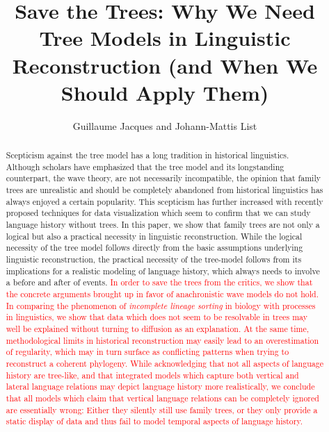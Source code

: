 \documentclass[svgnames,12pt]{scrartcl}
\title{Save the Trees: Why We Need Tree Models in Linguistic Reconstruction (and When We Should
Apply Them)}
\author{Guillaume Jacques and Johann-Mattis List}
\begin{document}
\maketitle

\begin{abstract}
  \small
Scepticism against the tree model has a long tradition in historical linguistics.  Although scholars
have emphasized that the tree model and its longstanding counterpart, the wave theory, are not
necessarily incompatible, the opinion that family trees are unrealistic and should be completely
abandoned from historical linguistics has always enjoyed a certain popularity. This scepticism has
further increased with recently proposed techniques for data visualization which seem to confirm
that we can study language history without trees.  In this paper, we show that family trees are not
only a logical but also a practical necessity in linguistic reconstruction. While the logical
necessity of the tree model follows directly from the basic assumptions underlying linguistic
reconstruction, the practical necessity of the tree-model follows from its implications for a
realistic modeling of language history, which always needs to involve a before and after of events.
\textcolor{red}{In order to save the trees from the critics, we show that the concrete arguments brought up in favor
of anachronistic wave models do not hold. In comparing the phenomenon of \emph{incomplete lineage
sorting} in biology with processes in linguistics, we show that data which does not seem to be
resolvable in trees may well be explained without turning to diffusion as an explanation. At the
same time, methodological limits in historical reconstruction may easily lead to an overestimation
of regularity, which may in turn surface as conflicting patterns when trying to reconstruct a
coherent phylogeny.  While acknowledging that not all aspects of language history are tree-like, and
that integrated models which capture both vertical and lateral language relations may depict
language history more realistically, we conclude that all models which claim that vertical language
relations can be completely ignored are essentially wrong: Either they silently still use family
trees, or they only provide a static display of data and thus fail to model temporal aspects of
language history.}
\end{abstract}
\end{document}
